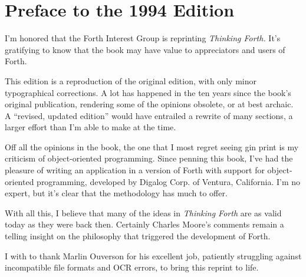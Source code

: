 \chapter*{Preface to the 1994 Edition}

I'm honored that the Forth Interest Group is reprinting \emph{Thinking
Forth.} It's gratifying to know that the book may have value to
appreciators and users of Forth.

This edition is a reproduction of the original edition, with only
minor typographical corrections. A lot has happened in the ten years
since the book's original publication, rendering some of the opinions
obsolete, or at best archaic. A ``revised, updated edition'' would
have entrailed a rewrite of many sections, a larger effort than I'm
able to make at the time.

Off all the opinions in the book, the one that I most regret seeing gin
print is my criticism of object-oriented programming. Since penning
this book, I've had the pleasure of writing an application in a
version of Forth with support for object-oriented programming,
developed by Digalog Corp. of Ventura, California. I'm no expert, but
it's clear that the methodology has much to offer.

With all this, I believe that many of the ideas in \emph{Thinking
Forth} are as valid today as they were back then. Certainly Charles
Moore's comments remain a telling insight on the philosophy that
triggered the development of Forth.

I with to thank Marlin Ouverson for his excellent job, patiently
struggling against incompatible file formats and OCR errors, to bring
this reprint to life.
